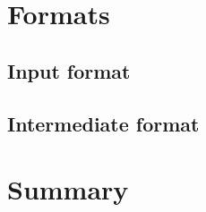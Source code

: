 \section{Formats}

\subsection{Input format}

\subsection{Intermediate format}


\section{Summary}

%
